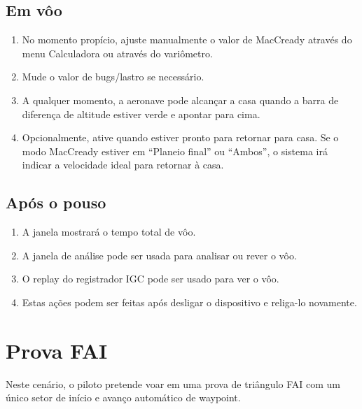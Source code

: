 \subsection*{Em vôo}
\begin{enumerate}
\item  No momento propício, ajuste manualmente o valor de MacCready através do menu Calculadora ou através do variômetro.
\item  Mude o valor de bugs/lastro se necessário.
\item  A qualquer momento, a aeronave pode alcançar a casa quando a barra de diferença de altitude estiver verde e apontar para cima.
\item  Opcionalmente, ative   quando estiver pronto para retornar para casa.  Se o modo MacCready estiver em “Planeio final” ou “Ambos”, o sistema irá indicar a velocidade ideal para retornar à casa.
\end{enumerate}

\subsection*{Após o pouso}
\begin{enumerate}
\item  A janela  mostrará o tempo total de vôo. 
\item  A janela de análise pode ser usada para analisar ou rever o vôo.
\item  O replay do registrador IGC pode ser usado para ver o vôo.
\item  Estas ações podem ser feitas após desligar o dispositivo e religa-lo novamente.
\end{enumerate}

\section{Prova FAI}\label{sec:fai-task}

Neste cenário, o piloto pretende voar em uma prova de triângulo FAI com um único setor de início e avanço automático de waypoint.

